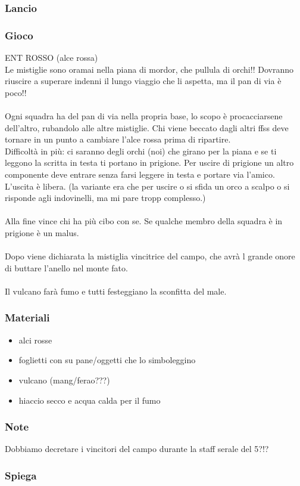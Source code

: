 \documentclass[../main.tex]{subfiles}
\begin{document}
        \subsubsection{Lancio}
        \subsubsection{Gioco}
        ENT ROSSO (alce rossa)\\
        Le mistiglie sono oramai nella piana di mordor, che pullula di orchi!! Dovranno riuscire a superare indenni il lungo viaggio che li aspetta, ma il pan di via è poco!!\\
\\
Ogni squadra ha del pan di via nella propria base, lo scopo è procacciarsene dell’altro, rubandolo alle altre mistiglie. Chi viene beccato dagli altri ffss deve tornare in un punto a cambiare l’alce rossa prima di ripartire. \\
Difficoltà in più: ci saranno degli orchi (noi) che girano per la piana e se ti leggono la scritta in testa ti portano in prigione. Per uscire di prigione un altro componente deve entrare senza farsi leggere in testa e portare via l’amico. L’uscita è libera. (la variante era che per uscire o si sfida un orco a scalpo o si risponde agli indovinelli, ma mi pare tropp complesso.) \\
\\
Alla fine vince chi ha più cibo con se. Se qualche membro della squadra è in prigione è un malus. \\
\\Dopo viene dichiarata la mistiglia vincitrice del campo, che avrà l grande onore di buttare l’anello nel monte fato. \\
\\
Il vulcano farà fumo e tutti festeggiano la sconfitta del male. 
        \subsubsection{Materiali}
        \begin{itemize}
            \item alci rosse
            \item foglietti con su pane/oggetti che lo simboleggino
            \item vulcano (mang/ferao???)
            \item hiaccio secco e acqua calda per il fumo
        \end{itemize}
        \subsubsection{Note}
        Dobbiamo decretare i vincitori del campo durante la staff serale del 5?!?
        \subsubsection{Spiega}
   
\end{document}

